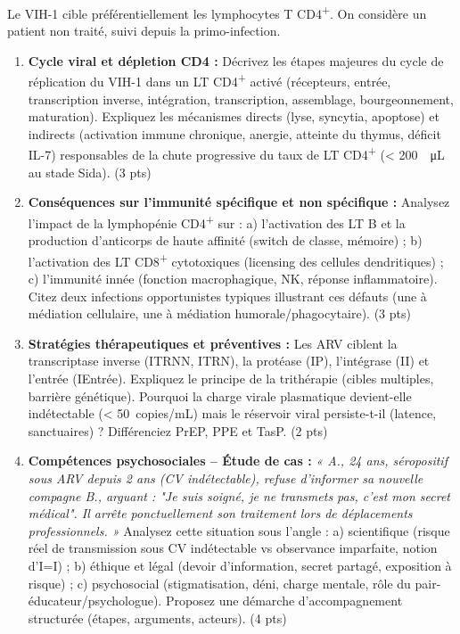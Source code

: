\documentclass[11pt]{article}
\begin{document}
\begin{exercice}
Le VIH-1 cible préférentiellement les lymphocytes T CD4\textsuperscript{+}. On considère un patient non traité, suivi depuis la primo-infection.

\begin{enumerate}
    \item \textbf{Cycle viral et dépletion CD4 :} Décrivez les étapes majeures du cycle de réplication du VIH-1 dans un LT CD4\textsuperscript{+} activé (récepteurs, entrée, transcription inverse, intégration, transcription, assemblage, bourgeonnement, maturation). Expliquez les mécanismes directs (lyse, syncytia, apoptose) et indirects (activation immune chronique, anergie, atteinte du thymus, déficit IL-7) responsables de la chute progressive du taux de LT CD4\textsuperscript{+} (< \SI{200}{\per\micro\liter} au stade Sida). (3 pts)
    \item \textbf{Conséquences sur l'immunité spécifique et non spécifique :} Analysez l'impact de la lymphopénie CD4\textsuperscript{+} sur : a) l'activation des LT B et la production d'anticorps de haute affinité (switch de classe, mémoire) ; b) l'activation des LT CD8\textsuperscript{+} cytotoxiques (licensing des cellules dendritiques) ; c) l'immunité innée (fonction macrophagique, NK, réponse inflammatoire). Citez deux infections opportunistes typiques illustrant ces défauts (une à médiation cellulaire, une à médiation humorale/phagocytaire). (3 pts)
    \item \textbf{Stratégies thérapeutiques et préventives :} Les ARV ciblent la transcriptase inverse (ITRNN, ITRN), la protéase (IP), l'intégrase (II) et l'entrée (IEntrée). Expliquez le principe de la trithérapie (cibles multiples, barrière génétique). Pourquoi la charge virale plasmatique devient-elle indétectable (< \SI{50}{copies/mL}) mais le réservoir viral persiste-t-il (latence, sanctuaires) ? Différenciez PrEP, PPE et TasP. (2 pts)
    \item \textbf{Compétences psychosociales – Étude de cas :} \textit{« A., 24 ans, séropositif sous ARV depuis 2 ans (CV indétectable), refuse d'informer sa nouvelle compagne B., arguant : "Je suis soigné, je ne transmets pas, c'est mon secret médical". Il arrête ponctuellement son traitement lors de déplacements professionnels. »}
    Analysez cette situation sous l'angle : a) scientifique (risque réel de transmission sous CV indétectable vs observance imparfaite, notion d'I=I) ; b) éthique et légal (devoir d'information, secret partagé, exposition à risque) ; c) psychosocial (stigmatisation, déni, charge mentale, rôle du pair-éducateur/psychologue). Proposez une démarche d'accompagnement structurée (étapes, arguments, acteurs). (4 pts)
\end{enumerate}
\end{exercice}
\end{document}
